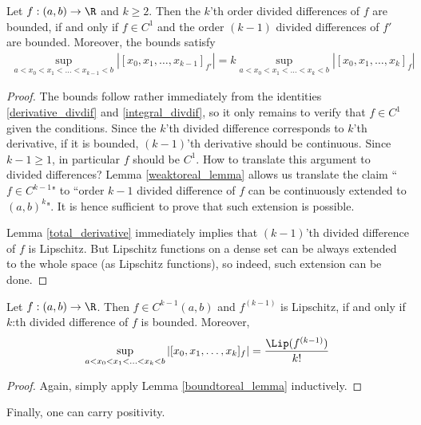 \begin{lem}\label{boundtoreal_lemma}
	Let $f : (a, b) \to \R$ and $k \geq 2$. Then the $k$'th order divided differences of $f$ are bounded, if and only if $f \in C^{1}$ and the order $(k - 1)$ divided differences of $f'$ are bounded. Moreover, the bounds satisfy
	\begin{align*}
		\sup_{a < x_{0} < x_{1} < \ldots < x_{k - 1} < b} |[x_{0}, x_{1}, \ldots, x_{k - 1}]_{f'}| = k \sup_{a < x_{0} < x_{1} < \ldots < x_{k}< b} |[x_{0}, x_{1}, \ldots, x_{k}]_{f}|
	\end{align*}
\end{lem}
\begin{proof}
	The bounds follow rather immediately from the identities \ref{derivative_divdif} and \ref{integral_divdif}, so it only remains to verify that $f \in C^{1}$ given the conditions. Since the $k$'th divided difference corresponds to $k$'th derivative, if it is bounded, $(k - 1)$'th derivative should be continuous. Since $k - 1 \geq 1$, in particular $f$ should be $C^{1}$. How to translate this argument to divided differences? Lemma \ref{weaktoreal_lemma} allows us translate the claim ``$f \in C^{k - 1}$" to ``order $k - 1$ divided difference of $f$ can be continuously extended to $(a, b)^{k}$". It is hence sufficient to prove that such extension is possible.

	Lemma \ref{total_derivative} immediately implies that $(k - 1)$'th divided difference of $f$ is Lipschitz. But Lipschitz functions on a dense set can be always extended to the whole space (as Lipschitz functions), so indeed, such extension can be done.
\end{proof}

\begin{lause}\label{bounded_div}
	Let $f : (a, b) \to \R$. Then $f \in C^{k - 1}(a, b)$ and $f^{(k - 1)}$ is Lipschitz, if and only if $k$:th divided difference of $f$ is bounded. Moreover,
	\begin{align*}
		\sup_{a < x_{0} < x_{1} < \ldots < x_{k}< b} |[x_{0}, x_{1}, \ldots, x_{k}]_{f}| = \frac{\Lip(f^{(k - 1)})}{k!}
	\end{align*}
\end{lause}
\begin{proof}
	Again, simply apply Lemma \ref{boundtoreal_lemma} inductively.
\end{proof}

Finally, one can carry positivity.

